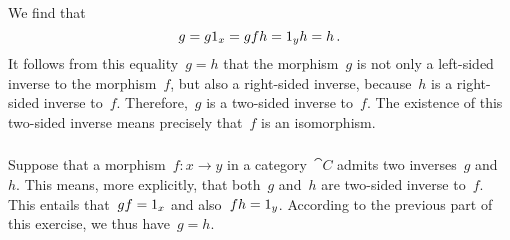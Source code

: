 \subsection{}



\subsubsection{}
\label{if left and right invertible then isomorphism}

We find that
\[
	g = g 1_x = g f h = 1_y h = h \,.
\]
It follows from this equality~$g = h$ that the morphism~$g$ is not only a left-sided inverse to the morphism~$f$, but also a right-sided inverse, because~$h$ is a right-sided inverse to~$f$.
Therefore,~$g$ is a two-sided inverse to~$f$.
The existence of this two-sided inverse means precisely that~$f$ is an isomorphism.



\subsubsection{}

Suppose that a morphism~$f \colon x \to y$ in a category~$\cat{C}$ admits two inverses~$g$ and~$h$.
This means, more explicitly, that both~$g$ and~$h$ are two-sided inverse to~$f$.
This entails that~$g f = 1_x$ and also~$f h = 1_y$.
According to the previous part of this exercise, we thus have~$g = h$.
